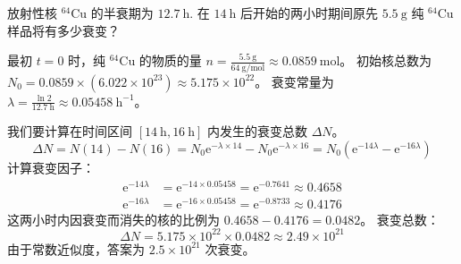 \begin{exercise}\label{ex:29.17}
放射性核 $^{64}\mathrm{Cu}$ 的半衰期为 $12.7 \ \mathrm{h}$. 在 $14 \ \mathrm{h}$ 后开始的两小时期间原先 $5.5 \ \mathrm{g}$ 纯 $^{64}\mathrm{Cu}$ 样品将有多少衰变？
\end{exercise}
\begin{solution}
最初 $t=0$ 时，纯 $^{64}\mathrm{Cu}$ 的物质的量 $n = \frac{5.5 \ \mathrm{g}}{64 \ \mathrm{g/mol}} \approx 0.0859 \ \mathrm{mol}$。
初始核总数为 $N_0 = 0.0859 \times (6.022 \times 10^{23}) \approx 5.175 \times 10^{22}$。
衰变常量为 $\lambda = \frac{\ln 2}{12.7 \ \mathrm{h}} \approx 0.05458 \ \mathrm{h^{-1}}$。

我们要计算在时间区间 $[14 \ \mathrm{h}, 16 \ \mathrm{h}]$ 内发生的衰变总数 $\Delta N$。
$$ \Delta N = N(14) - N(16) = N_0 \mathrm{e}^{-\lambda \times 14} - N_0 \mathrm{e}^{-\lambda \times 16} = N_0 \left( \mathrm{e}^{-14\lambda} - \mathrm{e}^{-16\lambda} \right) $$
计算衰变因子：
\begin{align*}
    \mathrm{e}^{-14\lambda} &= \mathrm{e}^{-14 \times 0.05458} = \mathrm{e}^{-0.7641} \approx 0.4658 \\
    \mathrm{e}^{-16\lambda} &= \mathrm{e}^{-16 \times 0.05458} = \mathrm{e}^{-0.8733} \approx 0.4176
\end{align*}
这两小时内因衰变而消失的核的比例为 $0.4658 - 0.4176 = 0.0482$。
衰变总数：
$$ \Delta N = 5.175 \times 10^{22} \times 0.0482 \approx 2.49 \times 10^{21} $$
由于常数近似度，答案为 $2.5 \times 10^{21}$ 次衰变。
\end{solution}

